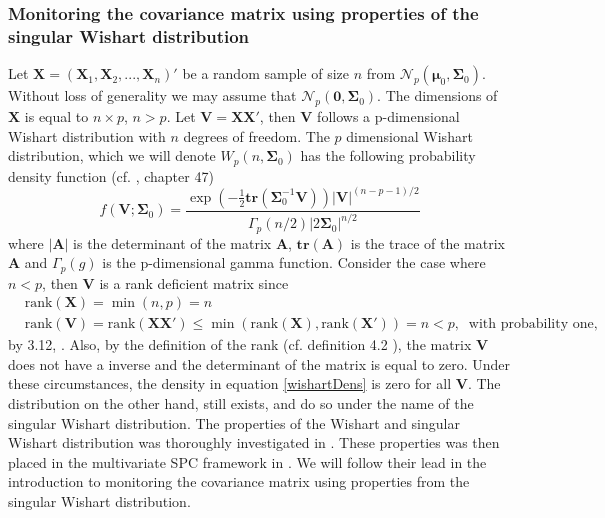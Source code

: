 \subsubsection{Monitoring the covariance matrix using properties of the singular Wishart distribution}\label{Wishartderiv}
Let $\mathbf{X}=(\mathbf{X}_1,\mathbf{X}_2,...,\mathbf{X}_n)'$ be a random sample of size $n$ from $\mathcal{N}_p(\boldsymbol{\mu}_0,\boldsymbol{\Sigma}_0)$. Without loss of generality we may assume that $\mathcal{N}_p(\mathbf{0},\boldsymbol{\Sigma}_0)$. The dimensions of $\mathbf{X}$ is equal to $n \times p$, $n>p$. Let $\mathbf{V}=\mathbf{X}\mathbf{X}'$, then $\mathbf{V}$ follows a p-dimensional Wishart distribution with $n$ degrees of freedom. The $p$ dimensional Wishart distribution, which we will denote $W_p(n,\boldsymbol{\Sigma}_0)$ has the following probability density function (cf. \citet{StatDists}, chapter 47)
\begin{equation}\label{wishartDens}
f(\mathbf{V};\boldsymbol{\Sigma}_0)=\frac{\exp\left(-\frac{1}{2}\mathbf{tr}(\boldsymbol{\Sigma}^{-1}_0\mathbf{V})\right) |\mathbf{V}|^{(n-p-1)/2}}{\Gamma_p(n/2) |2\boldsymbol{\Sigma}_0|^{n/2}}
\end{equation}
where $|\mathbf{A}|$ is the determinant of the matrix $\mathbf{A}$, $\mathbf{tr}(\mathbf{A})$ is the trace of the matrix $\mathbf{A}$ and $\Gamma_p(g)$ is the p-dimensional gamma function. Consider the case where $n<p$, then $\mathbf{V}$ is a rank deficient matrix since
\begin{align*}
&\text{rank}(\mathbf{X})=\min(n,p)=n \; \; &\\
&\text{rank}(\mathbf{V})=\text{rank}(\mathbf{X}\mathbf{X}')\leq \min(\text{rank}(\mathbf{X}),\text{rank}(\mathbf{X}'))=n<p, \;\; \text{with probability one,}&
\end{align*}
by 3.12, \citet{MatrixHandbook}. Also, by the definition of the rank (cf. definition 4.2 \citet{MatrixHandbook}), the matrix $\mathbf{V}$ does not have a inverse and the determinant of the matrix is equal to zero. Under these circumstances, the density in equation \eqref{wishartDens} is zero for all $\mathbf{V}$. The distribution on the other hand, still exists, and do so under the name of the singular Wishart distribution. The properties of the Wishart and singular Wishart distribution was thoroughly investigated in \citet{Bodnar20082389}. These properties was then placed in the multivariate SPC framework in \cite{Bodnar2009}. We will follow their lead in the introduction to monitoring the covariance matrix using properties from the singular Wishart distribution.

